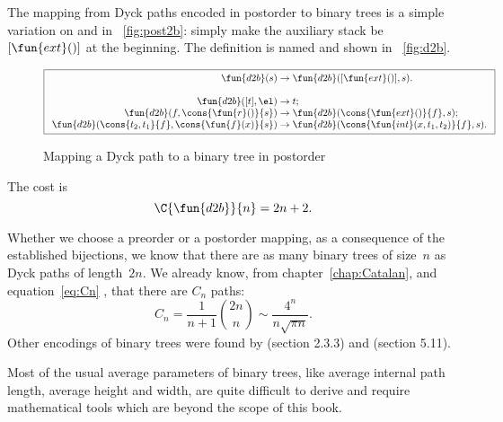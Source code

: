 The mapping from Dyck paths encoded in postorder to
binary trees is a simple variation on
 and
 in \fig~\vref{fig:post2b}:
simply make the auxiliary stack be \([\fun{ext}()]\) at the
beginning. The definition is named 
and shown in \fig~\vref{fig:d2b}.
\begin{figure}
\begin{equation*}
\boxed{
\begin{array}{r@{\;}c@{\;}l}
\fun{d2b}(s) & \rightarrow & \fun{d2b}([\fun{ext}()],s).\\
\\
\fun{d2b}([t],\el) & \rightarrow & t;\\
\fun{d2b}(f,\cons{\fun{r}()}{s}) & \rightarrow & \fun{d2b}(\cons{\fun{ext}()}{f},s);\\
\fun{d2b}(\cons{t_2,t_1}{f},\cons{\fun{f}(x)}{s}) & \rightarrow & \fun{d2b}(\cons{\fun{int}(x,t_1,t_2)}{f},s).
\end{array}}
\end{equation*}
\caption{Mapping a Dyck path to a binary tree in postorder}
\label{fig:d2b}
\end{figure}
The cost is
\begin{equation*}
  \C{\fun{d2b}}{n} = 2n + 2.
  \index{d2b@$\C{\fun{d2b}}{n}$}
\end{equation*}

Whether we choose a preorder or a postorder mapping, as a consequence
of the established bijections, we know that there are as many binary
trees of size~\(n\) as Dyck paths of length~\(2n\). We already know,
from chapter~\ref{chap:Catalan}, and equation~\eqref{eq:Cn}
, that there are \(C_n\) paths:
\begin{equation*}
  C_n = \frac{1}{n+1}\binom{2n}{n} \sim \frac{4^n}{n\sqrt{\pi n}}.
\end{equation*}
Other encodings of binary trees were found by \cite{Knuth_1997}
(section 2.3.3) and \cite{SedgewickFlajolet_1996} (section 5.11).


Most of the usual average parameters of binary trees, like
average internal path length, average height and width, are quite
difficult to derive and require mathematical tools which are beyond
the scope of this book.

